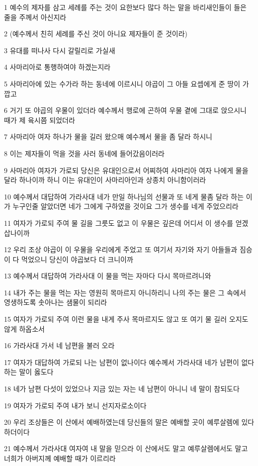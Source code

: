 \par 1 예수의 제자를 삼고 세례를 주는 것이 요한보다 많다 하는 말을 바리새인들이 들은 줄을 주께서 아신지라
\par 2 (예수께서 친히 세례를 주신 것이 아니요 제자들이 준 것이라)
\par 3 유대를 떠나사 다시 갈릴리로 가실새
\par 4 사마리아로 통행하여야 하겠는지라
\par 5 사마리아에 있는 수가라 하는 동네에 이르시니 야곱이 그 아들 요셉에게 준 땅이 가깝고
\par 6 거기 또 야곱의 우물이 있더라 예수께서 행로에 곤하여 우물 곁에 그대로 앉으시니 때가 제 육시쯤 되었더라
\par 7 사마리아 여자 하나가 물을 길러 왔으매 예수께서 물을 좀 달라 하시니
\par 8 이는 제자들이 먹을 것을 사러 동네에 들어갔음이러라
\par 9 사마리아 여자가 가로되 당신은 유대인으로서 어찌하여 사마리아 여자 나에게 물을 달라 하나이까 하니 이는 유대인이 사마리아인과 상종치 아니함이러라
\par 10 예수께서 대답하여 가라사대 네가 만일 하나님의 선물과 또 네게 물좀 달라 하는 이가 누구인줄 알았더면 네가 그에게 구하였을 것이요 그가 생수를 네게 주었으리라
\par 11 여자가 가로되 주여 물 길을 그릇도 없고 이 우물은 깊은데 어디서 이 생수를 얻겠삽나이까
\par 12 우리 조상 야곱이 이 우물을 우리에게 주었고 또 여기서 자기와 자기 아들들과 짐승이 다 먹었으니 당신이 야곱보다 더 크니이까
\par 13 예수께서 대답하여 가라사대 이 물을 먹는 자마다 다시 목마르려니와
\par 14 내가 주는 물을 먹는 자는 영원히 목마르지 아니하리니 나의 주는 물은 그 속에서 영생하도록 솟아나는 샘물이 되리라
\par 15 여자가 가로되 주여 이런 물을 내게 주사 목마르지도 않고 또 여기 물 길러 오지도 않게 하옵소서
\par 16 가라사대 가서 네 남편을 불러 오라
\par 17 여자가 대답하여 가로되 나는 남편이 없나이다 예수께서 가라사대 네가 남편이 없다 하는 말이 옳도다
\par 18 네가 남편 다섯이 있었으나 지금 있는 자는 네 남편이 아니니 네 말이 참되도다
\par 19 여자가 가로되 주여 내가 보니 선지자로소이다
\par 20 우리 조상들은 이 산에서 예배하였는데 당신들의 말은 예배할 곳이 예루살렘에 있다 하더이다
\par 21 예수께서 가라사대 여자여 내 말을 믿으라 이 산에서도 말고 예루살렘에서도 말고 너희가 아버지께 예배할 때가 이르리라
